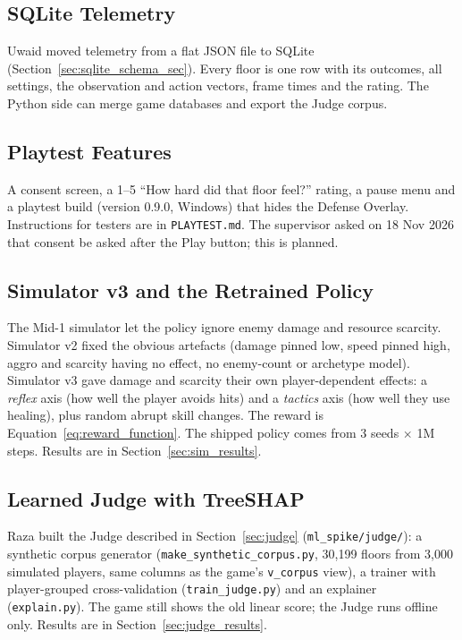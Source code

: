 \subsection{SQLite Telemetry}
Uwaid moved telemetry from a flat JSON file to SQLite (Section~\ref{sec:sqlite_schema_sec}). Every floor is one row with its outcomes, all settings, the observation and action vectors, frame times and the rating. The Python side can merge game databases and export the Judge corpus.

\subsection{Playtest Features}
A consent screen, a 1--5 ``How hard did that floor feel?'' rating, a pause menu and a playtest build (version 0.9.0, Windows) that hides the Defense Overlay. Instructions for testers are in \texttt{PLAYTEST.md}. The supervisor asked on 18 Nov 2026 that consent be asked after the Play button; this is planned.

\subsection{Simulator v3 and the Retrained Policy}
The Mid-1 simulator let the policy ignore enemy damage and resource scarcity. Simulator v2 fixed the obvious artefacts (damage pinned low, speed pinned high, aggro and scarcity having no effect, no enemy-count or archetype model). Simulator v3 gave damage and scarcity their own player-dependent effects: a \emph{reflex} axis (how well the player avoids hits) and a \emph{tactics} axis (how well they use healing), plus random abrupt skill changes. The reward is Equation~\ref{eq:reward_function}. The shipped policy comes from 3 seeds $\times$ 1M steps. Results are in Section~\ref{sec:sim_results}.

\subsection{Learned Judge with TreeSHAP}
Raza built the Judge described in Section~\ref{sec:judge} (\texttt{ml\_spike/judge/}): a synthetic corpus generator (\texttt{make\_synthetic\_corpus.py}, 30,199 floors from 3,000 simulated players, same columns as the game's \texttt{v\_corpus} view), a trainer with player-grouped cross-validation (\texttt{train\_judge.py}) and an explainer (\texttt{explain.py}). The game still shows the old linear score; the Judge runs offline only. Results are in Section~\ref{sec:judge_results}.

